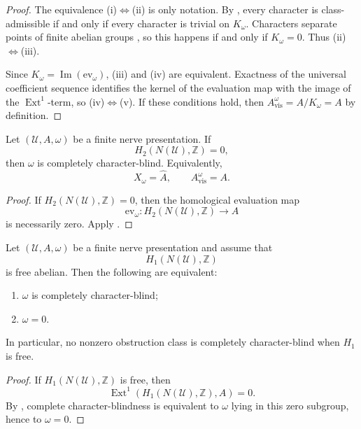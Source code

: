 \begin{proof}
The equivalence \textup{(i)}$\Leftrightarrow$\textup{(ii)} is only notation.
By , every character is
class-admissible if and only if every character is trivial on $K_{\omega}$.
Characters separate points of finite abelian groups
\cite[Chap.~2]{Terras1999}, so this happens if and only if $K_{\omega}=0$.
Thus \textup{(ii)}$\Leftrightarrow$\textup{(iii)}.

Since $K_{\omega}=\operatorname{Im}(\mathrm{ev}_{\omega})$,
\textup{(iii)} and \textup{(iv)} are equivalent. Exactness of the universal
coefficient sequence identifies the kernel of the evaluation map with the image
of the $\operatorname{Ext}^1$-term, so \textup{(iv)}$\Leftrightarrow$\textup{(v)}.
If these conditions hold, then
$A_{\mathrm{vis}}^{\omega}=A/K_{\omega}=A$ by definition.
\end{proof}

\begin{corollary}\label{cor:h2-vanishing-blindness}
Let $(\mathcal U,A,\omega)$ be a finite nerve presentation. If
\[
H_2(N(\mathcal U),\mathbb Z)=0,
\]
then $\omega$ is completely character-blind. Equivalently,
\[
X_{\omega}=\widehat A,
\qquad
A_{\mathrm{vis}}^{\omega}=A.
\]
\end{corollary}

\begin{proof}
If $H_2(N(\mathcal U),\mathbb Z)=0$, then the homological evaluation map
\[
\mathrm{ev}_{\omega}:H_2(N(\mathcal U),\mathbb Z)\to A
\]
is necessarily zero. Apply .
\end{proof}

\begin{corollary}\label{cor:h1-free-no-blindness}
Let $(\mathcal U,A,\omega)$ be a finite nerve presentation and assume that
\[
H_1(N(\mathcal U),\mathbb Z)
\]
is free abelian. Then the following are equivalent:
\begin{enumerate}[label=(\roman*),nosep]
\item $\omega$ is completely character-blind;
\item $\omega=0$.
\end{enumerate}
In particular, no nonzero obstruction class is completely character-blind when
$H_1$ is free.
\end{corollary}

\begin{proof}
If $H_1(N(\mathcal U),\mathbb Z)$ is free, then
\[
\operatorname{Ext}^1(H_1(N(\mathcal U),\mathbb Z),A)=0.
\]
By , complete character-blindness is
equivalent to $\omega$ lying in this zero subgroup, hence to $\omega=0$.
\end{proof}





